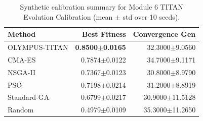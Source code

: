 \begin{table}[h]
\centering
\caption{Synthetic calibration summary for Module 6 TITAN Evolution Calibration (mean $\pm$ std over 10 seeds).}
\label{tab:module6_titan_evolution}
\begin{tabular}{lrr}
\toprule
Method & Best Fitness & Convergence Gen \\
\midrule
OLYMPUS-TITAN & \textbf{0.8500$\pm$0.0165} & 32.3000$\pm$9.0560 \\
CMA-ES & 0.7874$\pm$0.0122 & 34.7000$\pm$9.1171 \\
NSGA-II & 0.7367$\pm$0.0123 & 30.8000$\pm$8.9790 \\
PSO & 0.7198$\pm$0.0214 & 31.2000$\pm$8.8919 \\
Standard-GA & 0.6799$\pm$0.0217 & 30.9000$\pm$11.5128 \\
Random & 0.4979$\pm$0.0109 & 35.3000$\pm$11.2650 \\
\bottomrule
\end{tabular}
\end{table}